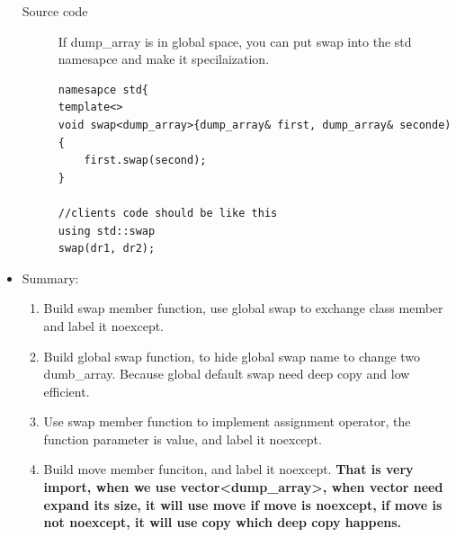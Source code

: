 \documentclass[a4paper,11pt,twoside]{book}
\begin{document}
\begin{itemize}
\begin{description}
    \item [Source code] If dump\_array is in global space, you can put swap into the std namesapce and make it specilaization.
\begin{lstlisting}
namesapce std{
template<> 
void swap<dump_array>{dump_array& first, dump_array& seconde){
	first.swap(second);
}

//clients code should be like this
using std::swap
swap(dr1, dr2); 
\end{lstlisting}

\end{description}

\item Summary:
\begin{enumerate}
	\item Build swap member function, use global swap to exchange class member and label it noexcept.
	\item Build global swap function, to hide global swap name to change two dumb\_array. Because global default swap need deep copy and low efficient. 
	\item Use swap member function to implement assignment operator, the function parameter is value, and label it noexcept. 
	\item Build move member funciton, and label it noexcept. \textbf{That is very import, when we use vector<dump\_array>, when vector need expand its size, it will use move if move is noexcept, if move is not noexcept, it will use copy which deep copy happens. }
\end{enumerate}
\end{itemize}
	
\end{document}
